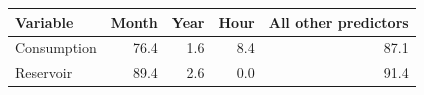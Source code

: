 \begin{tabular}{lrrrr}
\toprule
Variable & Month & Year & Hour & All other predictors \\
\midrule
Consumption & 76.4 & 1.6 & 8.4 & 87.1 \\
Reservoir & 89.4 & 2.6 & 0.0 & 91.4 \\
\bottomrule
\end{tabular}
